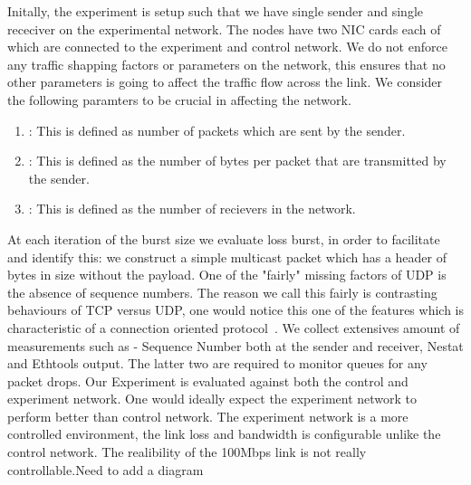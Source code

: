 \documentclass[11pt]{article}
\begin{document}
Initally, the experiment is setup such that we have single sender and single receciver on the experimental network. The nodes have two NIC cards each of which are connected to the experiment and control network. We do not enforce any traffic shapping factors or parameters on the network, this ensures that no other parameters is going to affect the traffic flow across the link. We consider the following paramters to be crucial in affecting the network. 
\begin{enumerate}
\item {}: This is defined as number of packets which are sent by the sender.
\item {}: This is defined as the number of bytes per packet that are transmitted by the sender.
\item {}: This is defined as the number of recievers in the network.
\end{enumerate}
At each iteration of the burst size we evaluate loss burst, in order to facilitate and identify this: we construct a simple multicast packet which has a header of  bytes in size without the payload. One of the "fairly" missing factors of UDP is the absence of sequence numbers. The reason we call this fairly is contrasting behaviours of TCP versus UDP, one would notice this one of the features which is characteristic of a connection oriented protocol~\cite{Code}. We collect extensives amount of measurements such as - Sequence Number both at the sender and receiver, Nestat and Ethtools output. The latter two are required to monitor queues for any packet drops. Our Experiment is evaluated against both the control and experiment network. One would ideally expect the experiment network to perform better than control network. The experiment network is a more controlled environment, the link loss and bandwidth is configurable unlike the control network. The realibility of the 100Mbps link is not really controllable.{Need to add a diagram}
\end{document}
